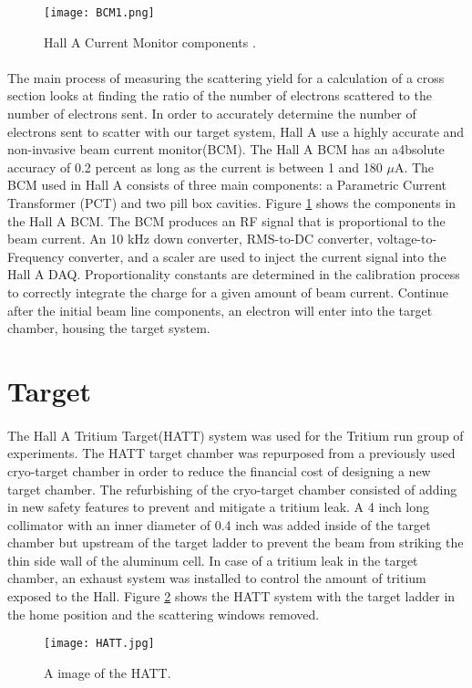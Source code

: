 		  	\begin{figure}[H]
		  	 	 		\centering
		  	 	 		\caption{Hall A Current Monitor components \cite{BCM1}. }
		  	 	 		\label{BCMpng}
		  	 	 		\texttt{[image: BCM1.png]} 
		  	\end{figure}
	
	\paragraph{} The main process of measuring the scattering yield for a calculation of a cross section looks at finding the ratio of the number of electrons scattered to the number of electrons sent. In order to accurately determine the number of electrons sent to scatter with our target system, Hall A use a highly accurate and non-invasive beam current monitor(BCM). The Hall A BCM has an a4bsolute accuracy of 0.2 percent as long as the current is between 1 and 180 $\mu$A. The BCM used in Hall A consists of three main components: a Parametric Current Transformer (PCT) and two pill box cavities. Figure \ref{BCMpng} shows the components in the Hall A BCM.  The BCM produces an RF signal that is proportional to the beam current. An 10 kHz down converter, RMS-to-DC converter, voltage-to-Frequency converter, and a scaler are used to inject the current signal into the Hall A DAQ. Proportionality constants are determined in the calibration process to correctly integrate the charge for a given amount of beam current\cite{BCM1}. Continue after the initial beam line components, an electron will enter into the target chamber, housing the target system.
	  
\section{Target}
\paragraph{} The Hall A Tritium Target(HATT) system was used for the Tritium run group of experiments. The HATT target chamber was repurposed from a previously used cryo-target chamber in order to reduce the financial cost of designing a new target chamber. The refurbishing of the cryo-target chamber consisted of adding in new safety features to prevent and mitigate a tritium leak.  A 4 inch long collimator with an inner diameter of 0.4 inch was added inside of the target chamber but upstream of the target ladder to prevent the beam from striking the thin side wall of the aluminum cell. In case of a tritium leak in the target chamber, an exhaust system was installed to control the amount of tritium exposed to the Hall.\cite{HATT_eng}  Figure \ref{HATT} shows the HATT system with the target ladder in the home position and the scattering windows removed. 
\begin{figure}
	\centering
	\texttt{[image: HATT.jpg]}
	\caption{A image of the HATT. \cite{DHimages} }
	\label{HATT}
\end{figure}

